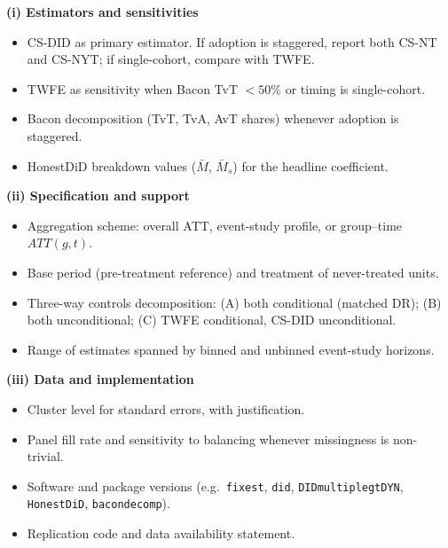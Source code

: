 \begin{landscape}
\begin{tcolorbox}[
  colback=gray!5,
  colframe=black!70,
  arc=1mm,
  boxrule=0.5pt,
  left=6pt,right=6pt,top=4pt,bottom=4pt,
]
{\noindent\begin{minipage}[t]{0.325\linewidth}
\textbf{(i) Estimators and sensitivities}
\begin{itemize}[leftmargin=1.2em, itemsep=1pt, topsep=2pt]
  \item CS-DID as primary estimator. If adoption is staggered, report both CS-NT and CS-NYT; if single-cohort, compare with TWFE.
  \item TWFE as sensitivity when Bacon TvT $< 50\%$ or timing is single-cohort.
  \item Bacon decomposition (TvT, TvA, AvT shares) whenever adoption is staggered.
  \item HonestDiD breakdown values ($\bar{M}$, $\bar{M}_s$) for the headline coefficient.
\end{itemize}
\end{minipage}\hfill
\begin{minipage}[t]{0.325\linewidth}
\textbf{(ii) Specification and support}
\begin{itemize}[leftmargin=1.2em, itemsep=1pt, topsep=2pt]
  \item Aggregation scheme: overall ATT, event-study profile, or group--time $ATT(g,t)$.
  \item Base period (pre-treatment reference) and treatment of never-treated units.
  \item Three-way controls decomposition: (A) both conditional (matched DR); (B) both unconditional; (C) TWFE conditional, CS-DID unconditional.
  \item Range of estimates spanned by binned and unbinned event-study horizons.
\end{itemize}
\end{minipage}\hfill
\begin{minipage}[t]{0.325\linewidth}
\textbf{(iii) Data and implementation}
\begin{itemize}[leftmargin=1.2em, itemsep=1pt, topsep=2pt]
  \item Cluster level for standard errors, with justification.
  \item Panel fill rate and sensitivity to balancing whenever missingness is non-trivial.
  \item Software and package versions (e.g.\ \texttt{fixest}, \texttt{did}, \texttt{DIDmultiplegtDYN}, \texttt{HonestDiD}, \texttt{bacondecomp}).
  \item Replication code and data availability statement.
\end{itemize}
\end{minipage}
}
\end{tcolorbox}


\end{landscape}
